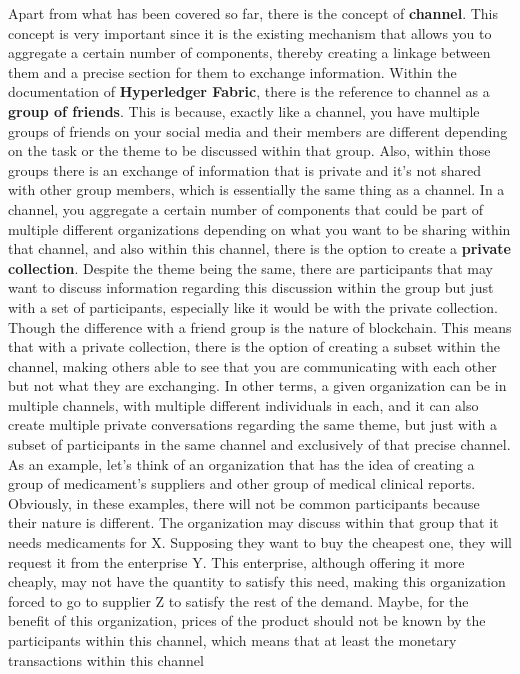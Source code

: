 Apart from what has been covered so far, there is the concept of \textbf{channel}. This concept is very important since it is the existing 
mechanism that allows you to aggregate a certain number of components, thereby creating a linkage between them and a precise section for 
them to exchange information. Within the documentation of \textbf{Hyperledger Fabric}, there is the reference to channel 
as a \textbf{group of friends}. This is because, exactly like a channel, you have multiple groups of friends on your social media and 
their members are different depending on the task or the theme to be discussed within that group. Also, within those groups there is an 
exchange of information that is private and it's not shared with other group members, which is essentially the same thing as a channel. In 
a channel, you aggregate a certain number of components that could be part of multiple different organizations depending on what you want 
to be sharing within that channel, and also within this channel, there is the option to create a \textbf{private collection}. Despite the 
theme being the same, there are participants that may want to discuss information regarding this discussion within the group but 
just with a set of participants, especially like it would be with the private collection. Though the difference with a friend group is 
the nature of blockchain. This means that with a private collection, there is the option of creating a subset within the channel, making 
others able to see that you are communicating with each other but not what they are exchanging. In other terms, a given organization can 
be in multiple channels, with multiple different individuals in each, and it can also create multiple private conversations regarding 
the same theme, but just with a subset of participants in the same channel and exclusively of that precise channel. As an example, 
let's think of an organization that has the idea of creating a group of medicament's suppliers and other group of medical clinical 
reports. Obviously, in these examples, there will not be common participants because their nature is different. The organization may 
discuss within that group that it needs medicaments for X. Supposing they want to buy the cheapest one, they will request it from the 
enterprise Y. This enterprise, although offering it more cheaply, may not have the quantity to satisfy this need, making this organization 
forced to go to supplier Z to satisfy the rest of the demand. Maybe, for the benefit of this organization, prices of the product 
should not be known by the participants within this channel, which means that at least the monetary transactions within this channel 
